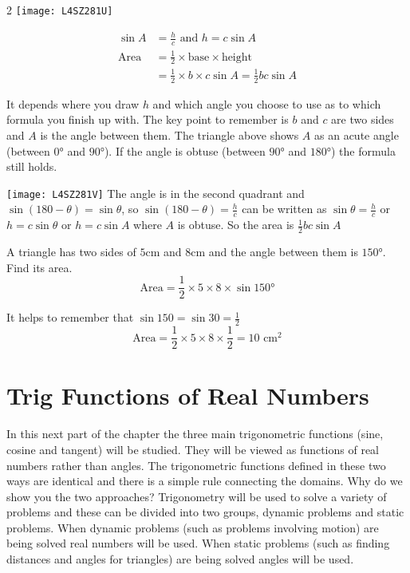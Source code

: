 \columnsep =30pt
\begin {multicols}{2} 
\texttt{[image: L4SZ281U]}

\begin{align*}\sin  A &  = \frac{h}{c}\text{ and }h =c \sin  A \\
\text{Area} &  =  \frac{1}{2} \times \text{base} \times \text{height} \\
 &  =  \frac{1}{2} \times b \times c \sin  A =\frac{1}{2} b c \sin  A
 \end{align*}
\end {multicols}
It depends where you draw $h$ and which angle you choose to use as to which formula you finish up with. The key point to remember is $b$ and $c$ are two sides and $A$ is the angle between them. The triangle above shows $A$ as an acute angle (between $\ang{0}$ and $\ang{90} $). If the angle is obtuse (between $\ang{90} $ and $\ang{180} $) the formula still holds. 
\begin{multicols}{2}
\texttt{[image: L4SZ281V]}
The angle is in the second quadrant and $\sin  (180 -\theta ) =\sin  \theta $, so $\sin  (180 -\theta ) =\frac{h}{c}$ can be written as $\sin  \theta  =\frac{h}{c}$ or $h =c \sin  \theta $ or $h =c \sin  A$ where $A$ is obtuse. So the area is $\frac{1}{2} b c \sin  A$ 
\end{multicols}
\example A triangle has two sides of $5 \mbox{cm}$ and $8 \mbox{cm}$ and the angle between them is $\ang{150} $. Find its area.\medskip\\
\solution
\begin{equation*}\text{Area} =\frac{1}{2} \times 5 \times 8 \times \sin  \ang{150} 
\end{equation*}

It helps to remember that $\sin  150 =\sin  30 =\frac{1}{2}$
\begin{equation*}\text{Area} =\frac{1}{2} \times 5 \times 8 \times \frac{1}{2} =10 \text{ cm}^{2}
\end{equation*}

\section{Trig Functions of Real Numbers}
In this next part of the chapter the three main trigonometric functions (sine, cosine and tangent) will be studied. They will be viewed as functions of real numbers rather than angles. The trigonometric functions defined in these two ways are identical and there is a simple rule connecting the domains. Why do we show you the two approaches? Trigonometry will be used to solve a variety of problems and these can be divided into two groups, dynamic problems and static problems. When dynamic problems (such as problems involving motion) are being solved real numbers will be used. When static problems (such as finding distances and angles for triangles) are being solved angles will be used. 

